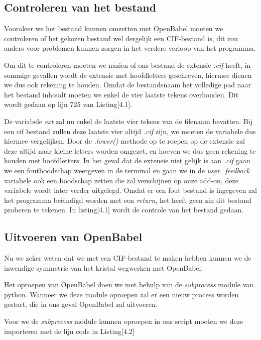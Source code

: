 \subsection{Controleren van het bestand}
Vooraleer we het bestand kunnen omzetten met OpenBabel moeten we controleren of het gekozen bestand wel dergelijk een CIF-bestand is, dit zou anders voor problemen kunnen zorgen in het verdere verloop van het programma.
\par
Om dit te controleren moeten we nazien of ons bestand de extensie \textit{.cif} heeft, in sommige gevallen wordt de extensie met hoofdletters geschreven, hiermee dienen we dus ook rekening te houden. Omdat de bestandsnaam het volledige pad naar het bestand inhoudt moeten we enkel de vier laatste tekens overhouden. Dit wordt gedaan op lijn 725 van Listing[4.1].
\par 
De variabele \textit{ext} zal nu enkel de laatste vier tekens van de filenaam bevatten. Bij een cif bestand zullen deze laatste vier altijd \textit{.cif} zijn, we moeten de variabele dus hiermee vergelijken. Door de \textit{.lower()} methode op te roepen op de extensie zal deze altijd naar kleine letters worden omgezet, en hoeven we dus geen rekening te houden met hoofdletters. In het geval dat de extensie niet gelijk is aan \textit{.cif} gaan we een foutboodschap weergeven in de terminal en gaan we in de \textit{user\_feedback} variabele ook een boodschap zetten die zal verschijnen op onze add-on, deze variabele wordt later verder uitgelegd. Omdat er een fout bestand is ingegeven zal het programma beëindigd worden met een \textit{return}, het heeft geen zin dit bestand proberen te tekenen. In listing[4.1] wordt de controle van het bestand gedaan.


\subsection{Uitvoeren van OpenBabel}
Nu we zeker weten dat we met een CIF-bestand te maken hebben kunnen we de inwendige symmetrie van het kristal wegwerken met OpenBabel. 
\par
Het oproepen van OpenBabel doen we met behulp van de \textit{subprocess} module van python. Wanneer we deze module oproepen zal er een nieuw process worden gestart, die in ons geval OpenBabel zal uitvoeren.
\par
Voor we de \textit{subprocess} module kunnen oproepen in ons script moeten we  deze importeren met de lijn code in Listing[4.2]

